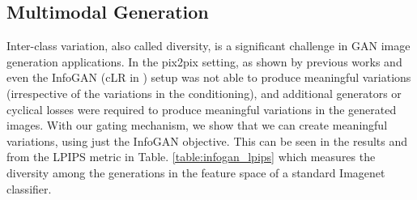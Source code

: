 \subsection{Multimodal Generation}
\label{sec:multimodal}


Inter-class variation, also called diversity, is a significant challenge in GAN image generation applications. 
In the pix2pix setting, as shown by previous works \cite{ghosh2017multi} and \cite{zhu2017toward} even the InfoGAN (cLR in \cite{zhu2017toward}) setup was not able to produce meaningful variations (irrespective of the variations in the conditioning), and additional generators or cyclical losses were required to produce meaningful variations in the generated images. 
With our gating mechanism, we show that we can create meaningful variations, using just the InfoGAN objective.
This can be seen in the results  and from the LPIPS metric \cite{zhang2018unreasonable} in  Table. \ref{table:infogan_lpips} which measures the diversity among the generations in the feature space of a standard Imagenet classifier.

